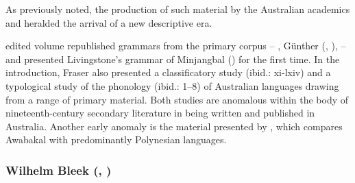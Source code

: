 \begin{table}
\end{table}


As previously noted, the production of such material by the Australian academics \citet{capell_structure_1937} and \citet{elkin_nature_1937} heralded the arrival of a new descriptive era.

 edited volume republished grammars from the primary corpus -- \citet{threlkeld_australian_1834}, Günther (\citeyear{gunther_native_1838}, \citeyear{gunther_lecture_1840}), \citet{taplin_notes_1872} -- and presented Livingstone’s grammar of Minjangbal (\citeyear{livingstone_grammar_1892}) for the first time. In the introduction, Fraser also presented a classificatory study (ibid.: xi-lxiv) and a typological study of the phonology (ibid.: 1--8) of Australian languages drawing from a range of primary material. Both studies are anomalous within the body of nineteenth-century secondary literature in being written and published in Australia. Another early anomaly is the material presented by \citet{threlkeld_key_1850}, which compares Awabakal with predominantly Polynesian languages. 

\subsubsection{Wilhelm Bleek (\citeyear{bleek_library_1858}, \citeyear{bleek_position_1872})}
\label{sec:key:1.1.4.1}

